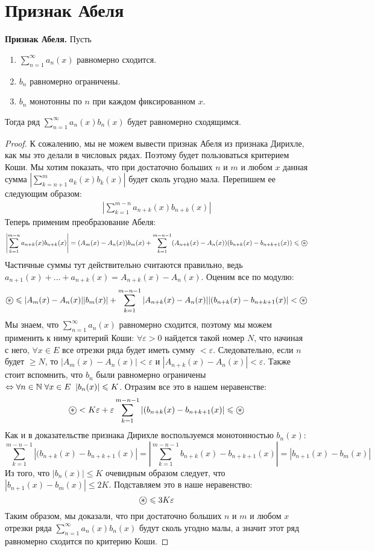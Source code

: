 \section{Признак Абеля}
\textbf{Признак Абеля.} Пусть \begin{enumerate}
    \item $\sum\limits_{n = 1}^\infty a_n(x)$ равномерно сходится.
    \item $b_n$ равномерно ограничены.
    \item $b_n$ монотонны по $n$ при каждом фиксированном $x$.
\end{enumerate}
Тогда ряд $\sum\limits_{n = 1}^\infty a_n(x)b_n(x)$ будет равномерно сходящимся.

\begin{proof}
    К сожалению, мы не можем вывести признак Абеля из признака Дирихле, как мы это делали в числовых рядах.
    Поэтому будет пользоваться критерием Коши. 
    Мы хотим показать, что при достаточно больших $n$ и $m$ и любом $x$ данная сумма $\left| \sum\limits_{k = n + 1}^m a_k(x)b_k(x) \right|$ будет сколь угодно мала.
    Перепишем ее следующим образом:
    \begin{gather*}
        \left| \sum\limits_{k = 1}^{m-n} a_{n+k}(x)b_{n+k}(x) \right|
    \end{gather*} 
    Теперь применим преобразование Абеля: 
    \[ \left| \sum\limits_{k = 1}^{m-n} a_{n+k}(x)b_{n+k}(x) \right| = (A_m(x) - A_n(x))b_m(x) + \sum_{k = 1}^{m - n - 1} (A_{n+k}(x) - A_n(x))(b_{n+k}(x) - b_{n+k+1}(x)) \leqslant \oast \]
    \quad Частичные суммы тут действительно считаются правильно, ведь $a_{n+1}(x) + \dots + a_{n+k}(x) = A_{n+k}(x) - A_n(x)$.
    Оценим все по модулю: \[ \oast \leqslant |A_m(x) - A_n(x)||b_m(x)| + \sum_{k = 1}^{m - n - 1} |A_{n+k}(x) - A_n(x)||(b_{n+k}(x) - b_{n+k+1}(x)| < \oast \]
    \quad Мы знаем, что $\sum\limits_{n = 1}^\infty a_n(x)$ равномерно сходится, поэтому мы можем применить к ниму критерий Коши: $\forall \varepsilon > 0$ найдется такой номер $N$, что начиная с него, $\forall x \in E$ все отрезки ряда будет иметь сумму $<\varepsilon$.
    Следовательно, если $n$ будет $\geqslant N$, то $|A_m(x) - A_n(x)| < \varepsilon$ и $|A_{n+k}(x) - A_n(x)| < \varepsilon$.
    Также стоит вспомнить, что $b_n$ были равномерно ограничены $\Leftrightarrow \forall n \in \mathbb{N} \; \forall x \in E \;\; |b_n(x)| \leqslant K$.
    Отразим все это в нашем неравенстве: \[ \oast < K\varepsilon + \varepsilon \sum_{k = 1}^{m - n - 1} |(b_{n+k}(x) - b_{n+k+1}(x)| \leqslant \oast \]
    \quad Как и в доказательстве признака Дирихле воспользуемся монотонностью $b_n(x)$:
    \[ \sum_{k = 1}^{m - n - 1} |(b_{n+k}(x) - b_{n+k+1}(x)| = \left|\sum_{k = 1}^{m - n - 1} b_{n+k}(x) - b_{n+k+1}(x) \right| = |b_{n+1}(x) - b_m(x)| \]
    \quad Из того, что $|b_n(x)| \leqslant K$ очевидным образом следует, что $|b_{n+1}(x) - b_m(x)| \leqslant 2K$. 
    Подставляем это в наше неравенство: \[ \oast \leqslant 3K\varepsilon  \]
    \quad Таким образом, мы доказали, что при достаточно больших $n$ и $m$ и любом $x$ отрезки ряда $\sum\limits_{n = 1}^\infty a_n(x)b_n(x)$ будут сколь угодно малы, а значит этот ряд равномерно сходится по критерию Коши.
\end{proof}

